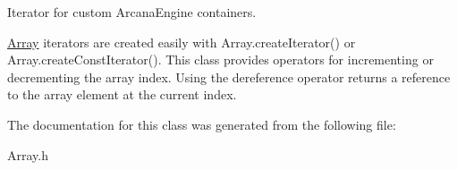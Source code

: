 Iterator for custom Arcana\+Engine containers. 

\mbox{\hyperlink{class_arcana_1_1_array}{Array}} iterators are created easily with Array.\+create\+Iterator() or Array.\+create\+Const\+Iterator(). This class provides operators for incrementing or decrementing the array index. Using the dereference operator returns a reference to the array element at the current index. 

The documentation for this class was generated from the following file\+:\begin{DoxyCompactItemize}
\item 
Array.\+h\end{DoxyCompactItemize}
